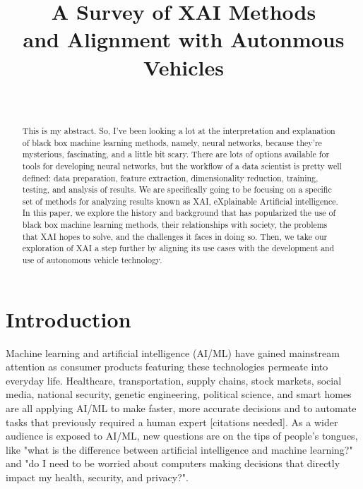 \documentclass{IEEEtran}
\begin{document}
\title{A Survey of XAI Methods\\and Alignment with Autonmous Vehicles}
\author{
    \\
}
\maketitle

\begin{abstract}
This is my abstract.  So, I've been looking a lot at the interpretation and explanation of black box machine learning methods, namely, neural networks, because they're mysterious, fascinating, and a little bit scary.  There are lots of options available for tools for developing neural networks, but the workflow of a data scientist is pretty well defined:  data preparation, feature extraction, dimensionality reduction, training, testing, and analysis of results.  We are specifically going to be focusing on a specific set of methods for analyzing results known as XAI, eXplainable Artificial intelligence.  In this paper, we explore the history and background that has popularized the use of black box machine learning methods, their relationships with society, the problems that XAI hopes to solve, and the challenges it faces in doing so.  Then, we take our exploration of XAI a step further by aligning its use cases with the development and use of autonomous vehicle technology.
\end{abstract}

\section{Introduction}

Machine learning and artificial intelligence (AI/ML) have gained mainstream attention as consumer products featuring these technologies permeate into everyday life.  Healthcare, transportation, supply chains, stock markets, social media, national security, genetic engineering, political science, and smart homes are all applying AI/ML to make faster, more accurate decisions and to automate tasks that previously required a human expert [citations needed].  As a wider audience is exposed to AI/ML, new questions are on the tips of people's tongues, like "what is the difference between artificial intelligence and machine learning?" and "do I need to be worried about computers making decisions that directly impact my health, security, and privacy?".
\end{document}
